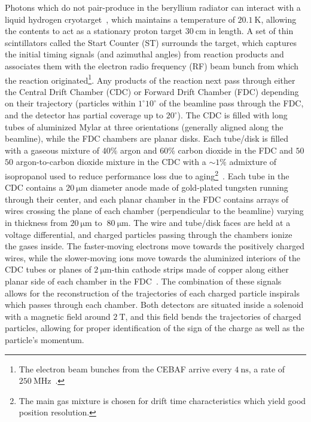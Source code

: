 Photons which do not pair-produce in the beryllium radiator can interact with a liquid hydrogen cryotarget~\cite{Adhikari2021}, which maintains a temperature of $\SI{20.1}{\K}$, allowing the contents to act as a stationary proton target $\SI{30}{\centi\meter}$ in length. A set of thin scintillators called the Start Counter (ST) surrounds the target, which captures the initial timing signals (and azimuthal angles) from reaction products and associates them with the electron radio frequency (RF) beam bunch from which the reaction originated\footnote{The electron beam bunches from the CEBAF arrive every $\SI{4}{\nano\s}$, a rate of $\SI{250}{\mega\hertz}$~\cite{Adhikari2021}.}. Any products of the reaction next pass through either the Central Drift Chamber (CDC) or Forward Drift Chamber (FDC) depending on their trajectory (particles within $1^{\circ}$\textendash$10^{\circ}$ of the beamline pass through the FDC, and the detector has partial coverage up to $20^{\circ}$). The CDC is filled with long tubes of aluminized Mylar at three orientations (generally aligned along the beamline), while the FDC chambers are planar disks. Each tube/disk is filled with a gaseous mixture of $40\%$ argon and $60\%$ carbon dioxide in the FDC and $50$\textemdash$50$ argon-to-carbon dioxide mixture in the CDC with a $\sim 1\%$ admixture of isopropanol used to reduce performance loss due to aging\footnote{The main gas mixture is chosen for drift time characteristics which yield good position resolution.}~\cite{Adhikari2021}. Each tube in the CDC contains a $\SI{20}{\micro\meter}$ diameter anode made of gold-plated tungsten running through their center, and each planar chamber in the FDC contains arrays of wires crossing the plane of each chamber (perpendicular to the beamline) varying in thickness from $\SI{20}{\micro\meter}$ to $~\SI{80}{\micro\meter}$. The wire and tube/disk faces are held at a voltage differential, and charged particles passing through the chambers ionize the gases inside. The faster-moving electrons move towards the positively charged wires, while the slower-moving ions move towards the aluminized interiors of the CDC tubes or planes of $\SI{2}{\micro\meter}$-thin cathode strips made of copper along either planar side of each chamber in the FDC~\cite{Adhikari2021}. The combination of these signals allows for the reconstruction of the trajectories of each charged particle inspirals which passes through each chamber. Both detectors are situated inside a solenoid with a magnetic field around $\SI{2}{\tesla}$, and this field bends the trajectories of charged particles, allowing for proper identification of the sign of the charge as well as the particle's momentum.

